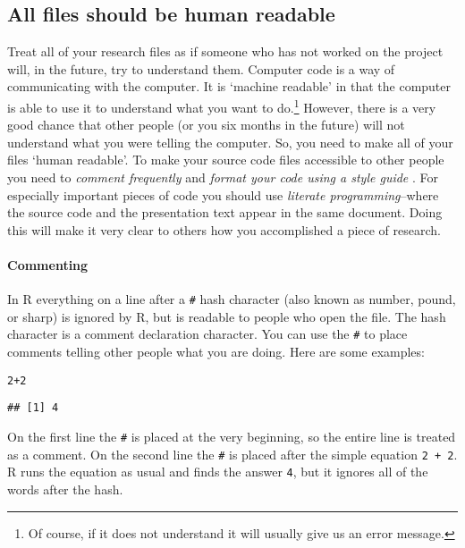 {\subsection{All files should be human readable}

Treat all of your research files as if someone who has not worked on the project will, in the future, try to understand them. Computer code is a way of communicating with the computer. It is `machine readable' in that the computer is able to use it to understand what you want to do.\footnote{Of course, if it does not understand it will usually give us an error message.} However, there is a very good chance that other people (or you six months in the future) will not understand what you were telling the computer. So, you need to make all of your files `human readable'. To make your source code files accessible to other people you need to {\emph{comment frequently}} \cite[3]{Bowers2011} and {\emph{format your code using a style guide}} \cite[]{Nagler1995}. For especially important pieces of code you should use {\emph{literate programming}}--where the source code and the presentation text appear in the same document. Doing this will make it very clear to others how you accomplished a piece of research.

\paragraph{Commenting}
In R everything on a line after a {\tt{\#}} hash character (also known as number, pound, or sharp) is ignored by R, but is readable to people who open the file. The hash character is a comment declaration character. You can use the {\tt{\#}} to place comments telling other people what you are doing. Here are some examples:

\begin{knitrout}
\color{fgcolor}\begin{kframe}
\begin{alltt}
2 + 2  
\end{alltt}
\begin{verbatim}
## [1] 4
\end{verbatim}
\end{kframe}
\end{knitrout}


\noindent On the first line the {\tt{\#}} is placed at the very beginning, so the entire line is treated as a comment. On the second line the {\tt{\#}} is placed after the simple equation \texttt{2 + 2}. R runs the equation as usual and finds the answer {\tt{4}}, but it ignores all of the words after the hash. 

}
